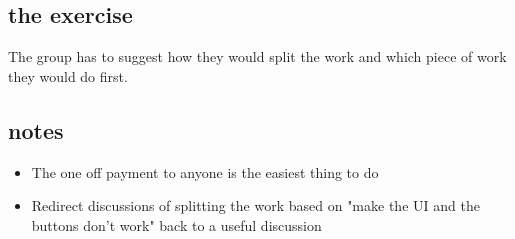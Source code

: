 \subsection*{the exercise}
The group has to suggest how they would split the work and which piece of work they would do first.

\subsection*{notes}
\begin{itemize}
\item The one off payment to anyone is the easiest thing to do
\item Redirect discussions of splitting the work based on "make the UI and the buttons don't work" back to a useful discussion 
\end{itemize}